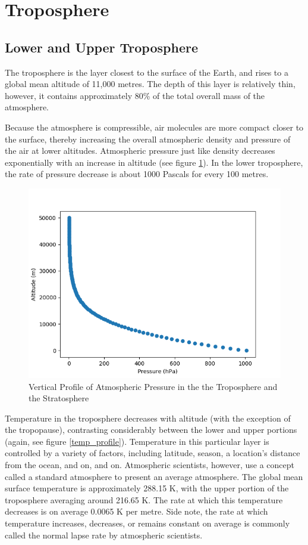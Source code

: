 \section{Troposphere}
\subsection{Lower and Upper Troposphere}
The troposphere is the layer closest to the surface of the Earth, and rises to a global mean altitude of 11,000 metres. The depth of this layer is relatively thin, however, it contains approximately 80\% of the total overall mass of the atmosphere. 

Because the atmosphere is compressible, air molecules are more compact closer to the surface, thereby increasing the overall atmospheric density and pressure of the air at lower altitudes. Atmospheric pressure just like density decreases exponentially with an increase in altitude (see figure \ref{atmospheric_pressure_intro}). In the lower troposphere, the rate of pressure decrease is about 1000 Pascals for every 100 metres.

\begin{figure}[H]
    \centering
    \includegraphics[width=.8\linewidth]{Images/vertical_pressure_profile}
    \caption{Vertical Profile of Atmospheric Pressure in the the Troposphere and the Stratosphere}
    \label{atmospheric_pressure_intro}
\end{figure}

Temperature in the troposphere decreases with altitude (with the exception of the tropopause), contrasting considerably between the lower and upper portions (again, see figure \ref{temp_profile}). Temperature in this particular layer is controlled by a variety of factors, including latitude, season, a location's distance from the ocean, and on, and on. Atmospheric scientists, however, use a concept called a standard atmosphere to present an average atmosphere\cite{temp_in_trop}. The global mean surface temperature is approximately 288.15 K, with the upper portion of the troposphere averaging around 216.65 K. The rate at which this temperature decreases is on average 0.0065 K per metre. Side note, the rate at which temperature increases, decreases, or remains constant on average is commonly called the normal lapse rate by atmospheric scientists.

